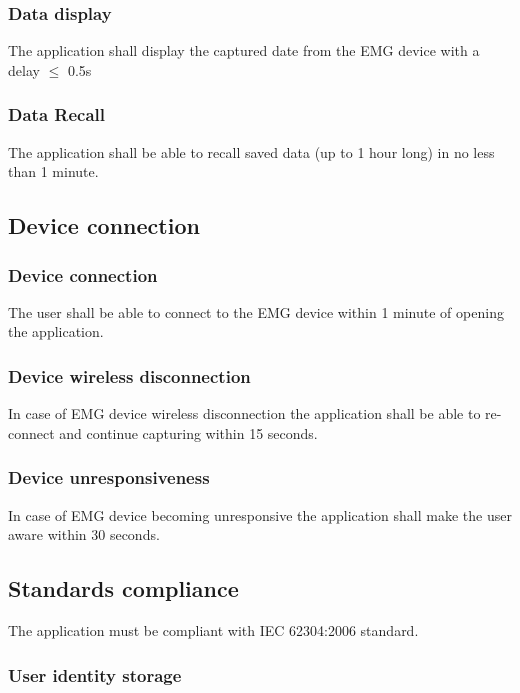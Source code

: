 \documentclass[12pt,a4paper]{article}
\begin{document}
\subsubsection{Data display}

The application shall display the captured date from the EMG device with a delay $\leq$ 0.5s

\subsubsection{Data Recall}

The application shall be able to recall saved data (up to 1 hour long) in no less than 1 minute.

\subsection{Device connection}

\subsubsection{Device connection}

The user shall be able to connect to the EMG device within 1 minute of opening the application.

\subsubsection{Device wireless disconnection}

In case of EMG device wireless disconnection the application shall be able to re-connect and continue capturing within 15 seconds.

\subsubsection{Device unresponsiveness}

In case of EMG device becoming unresponsive the application shall make the user aware within 30 seconds.

\subsection{Standards compliance}

The application must be compliant with IEC 62304:2006 standard.

\subsubsection{User identity storage}
\end{document}
